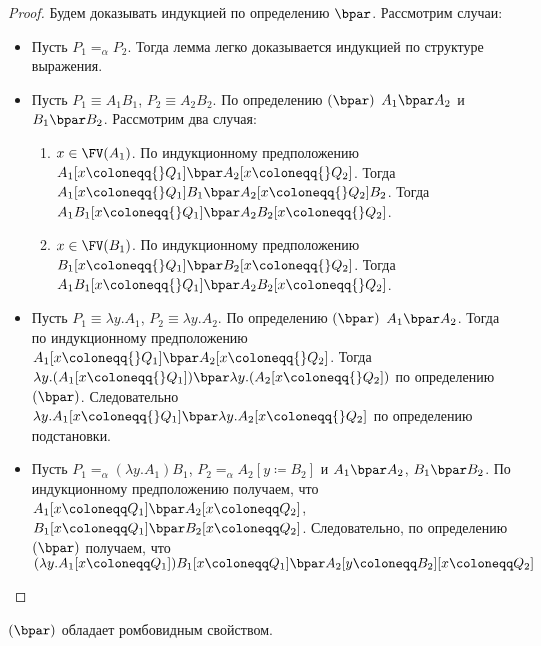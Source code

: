 \begin{proof}
	Будем доказывать индукцией по определению $\bpar $. Рассмотрим случаи:
	\begin{itemize}
		\item Пусть $P_{1}=_{\alpha}P_{2}$. Тогда лемма легко доказывается индукцией по структуре выражения.
		\item Пусть $P_{1}\equiv{}A_{1}B_{1}$, $P_{2}\equiv{}A_{2}B_{2}$. По определению $(\bpar)$ $A_{1} \bpar A_{2}$ и $B_{1} \bpar B_{2}$.
		Рассмотрим два случая:
		\begin{enumerate}
			\item $x \in \FV(A_{1})$. По индукционному предположению $A_{1}[x\coloneqq{}Q_{1}] \bpar A_{2}[x\coloneqq{}Q_{2}]$. Тогда $A_{1}[x\coloneqq{}Q_{1}]B_{1} \bpar A_{2}[x\coloneqq{}Q_{2}]B_{2}$. Тогда $A_{1}B_{1}[x\coloneqq{}Q_{1}] \bpar A_{2}B_{2}[x\coloneqq{}Q_{2}]$.
			\item $x \in \FV(B_{1})$. По индукционному предположению $B_{1}[x\coloneqq{}Q_{1}] \bpar B_{2}[x\coloneqq{}Q_{2}]$. Тогда $A_{1}B_{1}[x\coloneqq{}Q_{1}] \bpar A_{2}B_{2}[x\coloneqq{}Q_{2}]$.
		\end{enumerate}
		\item Пусть $P_{1}\equiv{}\lambda{}y.A_{1}$, $P_{2}\equiv{}\lambda{}y.A_{2}$. По определению $(\bpar)$ $A_{1}\bpar A_{2}$. Тогда по индукционному предположению $A_{1}[x\coloneqq{}Q_{1}] \bpar A_{2}[x\coloneqq{}Q_{2}]$. Тогда 
		$\lambda{}y.(A_{1}[x\coloneqq{}Q_{1}]) \bpar \lambda{}y.(A_{2}[x\coloneqq{}Q_{2}])$ по определению $(\bpar)$. Следовательно 	$\lambda{}y.A_{1}[x\coloneqq{}Q_{1}] \bpar \lambda{}y.A_{2}[x\coloneqq{}Q_{2}]$ по определению подстановки.
		\item Пусть $P_{1}=_\alpha(\lambda{}y.A_1)B_1$, $P_{2}=_\alpha A_2[y\coloneqq{}B_2]$ и $ A_1 \bpar A_2 $, $ B_1 \bpar B_2 $. По индукционному предположению получаем, что $A_1[x \coloneqq Q_1] \bpar A_2[x \coloneqq Q_2]$, $B_1[x \coloneqq Q_1] \bpar B_2[x \coloneqq Q_2]$. Следовательно, по определению $(\bpar)$ получаем, что $ (\lambda{}y.A_1[x\coloneqq Q_1])B_1[x \coloneqq Q_1] \bpar  A_2[y \coloneqq B_2][x \coloneqq Q_2]$
	\end{itemize}
\end{proof}

\begin{lemma}
	$(\bpar)$ обладает ромбовидным свойством.
\end{lemma}

